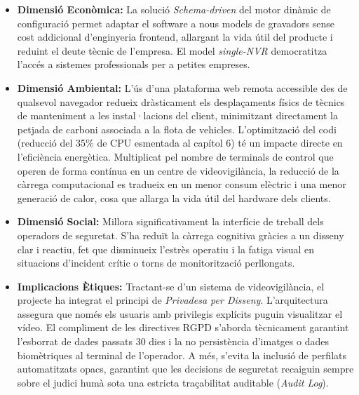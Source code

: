 \begin{itemize}
  \item \textbf{Dimensió Econòmica:} La solució \textit{Schema-driven} del motor dinàmic de configuració permet adaptar el software a nous models de gravadors sense cost addicional d'enginyeria frontend, allargant la vida útil del producte i reduint el deute tècnic de l'empresa. El model \textit{single-NVR} democratitza l'accés a sistemes professionals per a petites empreses.
  \item \textbf{Dimensió Ambiental:} L'ús d'una plataforma web remota accessible des de qualsevol navegador redueix dràsticament els desplaçaments físics de tècnics de manteniment a les instal·lacions del client, minimitzant directament la petjada de carboni associada a la flota de vehicles. L'optimització del codi (reducció del 35\% de CPU esmentada al capítol 6) té un impacte directe en l'eficiència energètica. Multiplicat pel nombre de terminals de control que operen de forma contínua en un centre de videovigilància, la reducció de la càrrega computacional es tradueix en un menor consum elèctric i una menor generació de calor, cosa que allarga la vida útil del hardware dels clients.
  \item \textbf{Dimensió Social:} Millora significativament la interfície de treball dels operadors de seguretat. S'ha reduït la càrrega cognitiva gràcies a un disseny clar i reactiu, fet que disminueix l'estrès operatiu i la fatiga visual en situacions d'incident crític o torns de monitorització perllongats.
  \item \textbf{Implicacions Ètiques:} Tractant-se d'un sistema de videovigilància, el projecte ha integrat el principi de \textit{Privadesa per Disseny}. L'arquitectura assegura que només els usuaris amb privilegis explícits puguin visualitzar el vídeo. El compliment de les directives RGPD s'aborda tècnicament garantint l'esborrat de dades passats 30 dies i la no persistència d'imatges o dades biomètriques al terminal de l'operador. A més, s'evita la inclusió de perfilats automatitzats opacs, garantint que les decisions de seguretat recaiguin sempre sobre el judici humà sota una estricta traçabilitat auditable (\textit{Audit Log}).
\end{itemize}